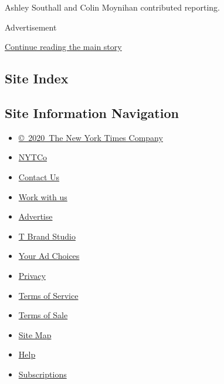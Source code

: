 Ashley Southall and Colin Moynihan contributed reporting.

Advertisement

\protect\hyperlink{after-bottom}{Continue reading the main story}

\hypertarget{site-index}{%
\subsection{Site Index}\label{site-index}}

\hypertarget{site-information-navigation}{%
\subsection{Site Information
Navigation}\label{site-information-navigation}}

\begin{itemize}
\tightlist
\item
  \href{https://help.nytimes3xbfgragh.onion/hc/en-us/articles/115014792127-Copyright-notice}{©~2020~The
  New York Times Company}
\end{itemize}

\begin{itemize}
\tightlist
\item
  \href{https://www.nytco.com/}{NYTCo}
\item
  \href{https://help.nytimes3xbfgragh.onion/hc/en-us/articles/115015385887-Contact-Us}{Contact
  Us}
\item
  \href{https://www.nytco.com/careers/}{Work with us}
\item
  \href{https://nytmediakit.com/}{Advertise}
\item
  \href{http://www.tbrandstudio.com/}{T Brand Studio}
\item
  \href{https://www.nytimes3xbfgragh.onion/privacy/cookie-policy\#how-do-i-manage-trackers}{Your
  Ad Choices}
\item
  \href{https://www.nytimes3xbfgragh.onion/privacy}{Privacy}
\item
  \href{https://help.nytimes3xbfgragh.onion/hc/en-us/articles/115014893428-Terms-of-service}{Terms
  of Service}
\item
  \href{https://help.nytimes3xbfgragh.onion/hc/en-us/articles/115014893968-Terms-of-sale}{Terms
  of Sale}
\item
  \href{https://spiderbites.nytimes3xbfgragh.onion}{Site Map}
\item
  \href{https://help.nytimes3xbfgragh.onion/hc/en-us}{Help}
\item
  \href{https://www.nytimes3xbfgragh.onion/subscription?campaignId=37WXW}{Subscriptions}
\end{itemize}
